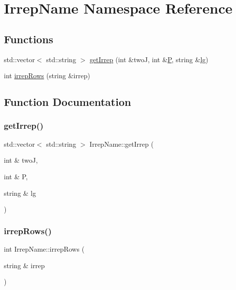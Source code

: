 \hypertarget{namespaceIrrepName}{}\section{Irrep\+Name Namespace Reference}
\label{namespaceIrrepName}
\subsection*{Functions}
\begin{DoxyCompactItemize}
\item 
std\+::vector$<$ std\+::string $>$ \mbox{\hyperlink{namespaceIrrepName_aafd6a227d49ac073e93e6954332007bf}{get\+Irrep}} (int \&twoJ, int \&\mbox{\hyperlink{operator__name__util_8cc_aef94be98e2c9e4a4dece75f60ca9792c}{P}}, string \&\mbox{\hyperlink{irrep__util_8cc_a4d8a3f7f88843b4554b53842b9951ece}{lg}})
\item 
int \mbox{\hyperlink{namespaceIrrepName_a3964736788de2a425b5a41ff069f907b}{irrep\+Rows}} (string \&irrep)
\end{DoxyCompactItemize}


\subsection{Function Documentation}
\mbox{\label{namespaceIrrepName_aafd6a227d49ac073e93e6954332007bf}} 
\subsubsection{\texorpdfstring{getIrrep()}{getIrrep()}}
{\footnotesize\ttfamily std\+::vector$<$ std\+::string $>$ Irrep\+Name\+::get\+Irrep (\begin{DoxyParamCaption}\item[{int \&}]{twoJ,  }\item[{int \&}]{P,  }\item[{string \&}]{lg }\end{DoxyParamCaption})}

\mbox{\label{namespaceIrrepName_a3964736788de2a425b5a41ff069f907b}} 
\subsubsection{\texorpdfstring{irrepRows()}{irrepRows()}}
{\footnotesize\ttfamily int Irrep\+Name\+::irrep\+Rows (\begin{DoxyParamCaption}\item[{string \&}]{irrep }\end{DoxyParamCaption})}

